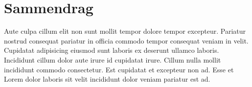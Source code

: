\chapter*{Sammendrag}
Aute culpa cillum elit non sunt mollit tempor dolore tempor excepteur. Pariatur nostrud consequat pariatur in officia commodo tempor consequat veniam in velit. Cupidatat adipisicing eiusmod sunt laboris ex deserunt ullamco laboris. Incididunt cillum dolor aute irure id cupidatat irure. Cillum nulla mollit incididunt commodo consectetur. Est cupidatat et excepteur non ad. Esse et Lorem dolor laboris sit velit incididunt dolor veniam pariatur est ad.